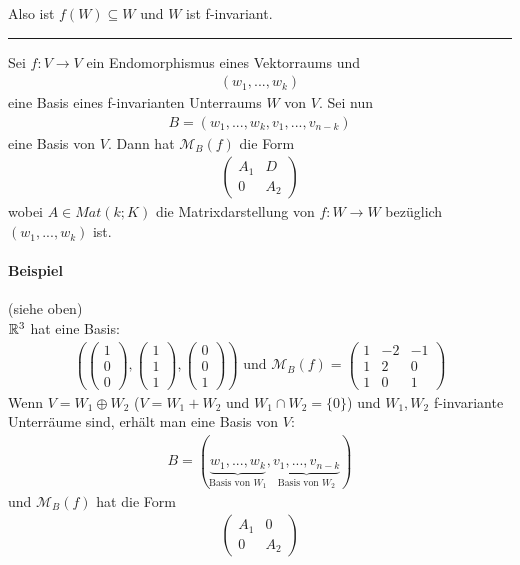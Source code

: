 Also ist $f(W) \subseteq W$ und $W$ ist f-invariant.
\vspace*{0.2cm} \\ \rule{\linewidth}{0.3mm}\vspace*{0.1cm}
Sei $f: V \rightarrow V$ ein Endomorphismus eines Vektorraums und 
\begin{align}
(w_1, ..., w_k)
\end{align}
eine Basis eines f-invarianten Unterraums $W$ von $V$. Sei nun
\begin{align}
B = (w_1, ..., w_k, v_1, ..., v_{n-k})
\end{align}
eine Basis von $V$. Dann hat $\mathcal{M}_{B} (f)$ die Form
\begin{align}
\begin{pmatrix} A_1 & D \\ 0 & A_2\end{pmatrix}
\end{align}
wobei $A \in Mat(k;K)$ die Matrixdarstellung von $f: W \rightarrow W$ bezüglich $(w_1, ..., w_k)$ ist.
\paragraph{Beispiel} (siehe oben) \\
$\mathbb{R}^3$ hat eine Basis:
\begin{align}
(\begin{pmatrix} 1 \\ 0 \\ 0 \end{pmatrix}, \begin{pmatrix} 1 \\ 1 \\ 1 \end{pmatrix}, \begin{pmatrix} 0 \\ 0 \\ 1 \end{pmatrix}) \text{ und } \mathcal{M}_{B} (f) = \begin{pmatrix} 1 & -2 & -1 \\ 1 & 2 & 0 \\ 1 & 0 & 1\end{pmatrix}
\end{align}
Wenn $V = W_1 \oplus W_2$ ($V = W_1 + W_2$ und $W_1 \cap W_2 = \{0\}$) und $W_1, W_2$ f-invariante Unterräume sind, erhält man eine Basis von $V$:
\begin{align}
B = (\underbrace{w_1, ..., w_k}_{\text{Basis von } W_1}, \underbrace{v_1, ..., v_{n-k}}_{\text{Basis von } W_2})
\end{align}
und $\mathcal{M}_{B} (f)$ hat die Form
\begin{align}
\begin{pmatrix} A_1 & 0 \\ 0 & A_2\end{pmatrix}
\end{align}

